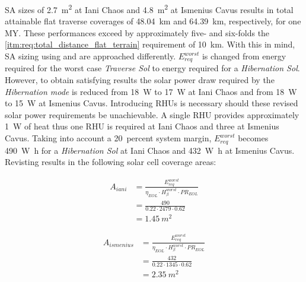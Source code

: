 \clearpage
\ac{SA} sizes of \SI{2.7}{m^{2}} at Iani Chaos and \SI{4.8}{m^{2}} at Ismenius Cavus results in total attainable flat traverse coverages of \SI{48.04}{\kilo\meter} and \SI{64.39}{\kilo\meter}, respectively, for one \ac{MY}. These performances exceed by approximately five- and six-folds the \ref{itm:req:total_distance_flat_terrain} requirement of \SI{10}{\kilo\meter}. With this in mind, \ac{SA} sizing using  and  are approached differently. $E_{req}^{worst}$ is changed from energy required for the worst case \textit{Traverse Sol} to energy required for a \textit{Hibernation Sol}. However, to obtain satisfying results the solar power draw required by the \textit{Hibernation mode} is reduced from \SI{18}{\watt} to \SI{17}{\watt} at Iani Chaos and from \SI{18}{\watt} to \SI{15}{\watt} at Ismenius Cavus. Introducing \acp{RHU} is necessary should these revised solar power requirements be unachievable. A single \ac{RHU} provides approximately \SI{1}{\watt} of heat thus one \ac{RHU} is required at Iani Chaos and three at Ismenius Cavus. Taking into account a \SI{20}{percent} system margin, $E_{req}^{worst}$ becomes \SI{490}{\watt\hour} for a \textit{Hibernation Sol} at Iani Chaos and \SI{432}{\watt\hour} at Ismenius Cavus. Revisting  results in the following solar cell coverage areas:


\begin{align}
  \label{calc:solar_cell_area_iani_chaos_hibernation}
  A_{iani} &= \frac{E_{req}^{worst}}{\eta_{EOL} \cdot H_{\beta}^{worst} \cdot PR_{EOL}}\\
           &= \frac{490}{0.22 \cdot 2479 \cdot 0.62}\\
           &= \SI{1.45}{m^{2}}
\end{align}

\begin{align}
  \label{calc:solar_cell_area_ismenius_cavus_hibernation}
  A_{ismenius} &= \frac{E_{req}^{worst}}{\eta_{EOL} \cdot H_{\beta}^{worst} \cdot PR_{EOL}}\\
               &= \frac{432}{0.22 \cdot 1345 \cdot 0.62}\\
               &= \SI{2.35}{m^{2}}
\end{align}


